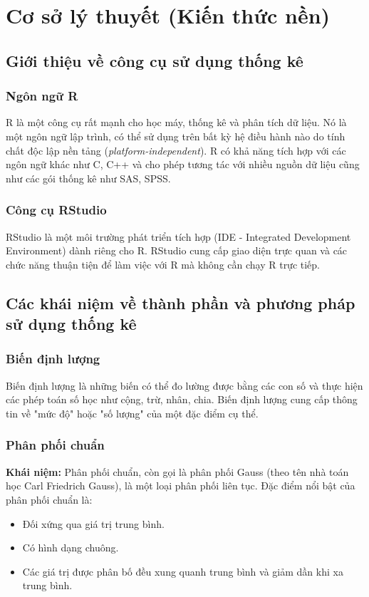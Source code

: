\section{Cơ sở lý thuyết (Kiến thức nền)}

\subsection{Giới thiệu về công cụ sử dụng thống kê}

\subsubsection{Ngôn ngữ R}
R là một công cụ rất mạnh cho học máy, thống kê và phân tích dữ liệu. Nó là một ngôn ngữ lập trình, có thể sử dụng trên bất kỳ hệ điều hành nào do tính chất độc lập nền tảng (\textit{platform-independent}). R có khả năng tích hợp với các ngôn ngữ khác như C, C++ và cho phép tương tác với nhiều nguồn dữ liệu cũng như các gói thống kê như SAS, SPSS.

\subsubsection{Công cụ RStudio}
RStudio là một môi trường phát triển tích hợp (IDE - Integrated Development Environment) dành riêng cho R. RStudio cung cấp giao diện trực quan và các chức năng thuận tiện để làm việc với R mà không cần chạy R trực tiếp.

\subsection{Các khái niệm về thành phần và phương pháp sử dụng thống kê}

\subsubsection{Biến định lượng}
Biến định lượng là những biến có thể đo lường được bằng các con số và thực hiện các phép toán số học như cộng, trừ, nhân, chia. Biến định lượng cung cấp thông tin về "mức độ" hoặc "số lượng" của một đặc điểm cụ thể.

\subsubsection{Phân phối chuẩn}

\textbf{Khái niệm:}  
Phân phối chuẩn, còn gọi là phân phối Gauss (theo tên nhà toán học Carl Friedrich Gauss), là một loại phân phối liên tục. Đặc điểm nổi bật của phân phối chuẩn là:
\begin{itemize}
    \item Đối xứng qua giá trị trung bình.
    \item Có hình dạng chuông.
    \item Các giá trị được phân bố đều xung quanh trung bình và giảm dần khi xa trung bình.
\end{itemize}

